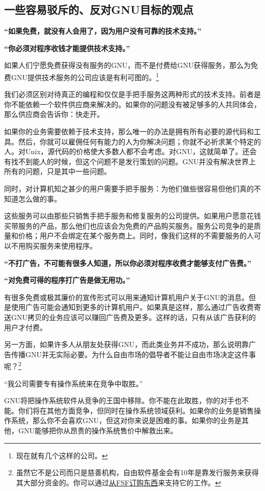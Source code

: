 \subsection{一些容易驳斥的、反对GNU目标的观点}
\bf“如果免费，就没有人会用了，因为用户没有可靠的技术支持。”\normalall\par
\bf“你必须对程序收钱才能提供技术支持。”\normalall\par
如果人们宁愿免费获得没有服务的GNU，而不是付费给GNU获得服务，那么为免费GNU提供技术服务的公司应该是有利可图的。\footnote{现在就有几个这样的公司。}\par
我们必须区别对待真正的编程和仅仅是手把手服务这两种形式的技术支持。前者是你不能依赖一个软件供应商来解决的。如果你的问题没有被足够多的人共同体会，那么供应商会告诉你：快走开。\par
如果你的业务需要依赖于技术支持，那么唯一的办法是拥有所有必要的源代码和工具。然后，你就可以雇佣任何有能力的人为你解决问题；你就不必祈求某个特定的人。对Unix，源代码的价格使大多数人都不会考虑。对GNU，这就简单了。还会有找不到能人的时候，但这个问题不是发行策划的问题。GNU并没有解决世界上所有的问题，只是其中一些问题。\par
同时，对计算机知之甚少的用户需要手把手服务：为他们做些很容易但他们真的不知道怎么做的事。\par
这些服务可以由那些只销售手把手服务和修复服务的公司提供。如果用户愿意花钱买带服务的产品，那么他们也应该会为免费的产品购买服务。服务公司竞争的是质量和价格；用户不会绑定在某个服务商上。同时，像我们这样的不需要服务的人可以不用购买服务来使用程序。\par
\bf“不打广告，不可能有很多人知道，所以你必须对程序收费才能够支付广告费。”\normalall\par
\bf“对免费可得的程序打广告是做无用功。”\normalall\par
有很多免费或极其廉价的宣传形式可以用来通知计算机用户关于GNU的消息。但是使用广告可能会通知到更多的计算机用户。如果真是这样，那么通过广告收费寄送GNU拷贝的业务应该可以赚回广告费及更多。这样的话，只有从该广告获利的用户才付费。\par
另一方面，如果许多人从朋友处获得GNU，而此类业务并不成功，那么说明靠广告传播GNU并无实际必要。为什么自由市场的倡导者不能让自由市场决定这件事呢？\footnote{虽然它不是公司而只是慈善机构，自由软件基金会有10年是靠发行服务来获得其大部分资金的。你可以通过\href{http://www.gnu.org/order/order.html}{从FSF订购东西}来支持它的工作。 }\par
“我公司需要专有操作系统来在竞争中取胜。”\par
GNU将把操作系统软件从竞争的王国中移除。你不能在此取胜，你的对手也不能。你们将在其他方面竞争，但同时在操作系统领域获利。如果你的业务是销售操作系统，那么你不会喜欢GNU，但这对你来说是困难的事。如果你的业务是其他，GNU能够把你从昂贵的操作系统售价中解救出来。\par
